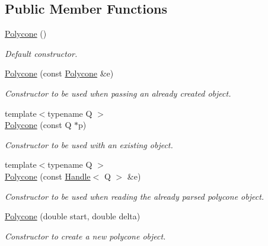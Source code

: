 \subsection*{Public Member Functions}
\begin{DoxyCompactItemize}
\item 
\hyperlink{class_d_d4hep_1_1_geometry_1_1_polycone_a0946449c311d2cfdb9381e9dd975f6e9}{Polycone} ()
\begin{DoxyCompactList}\small\item\em Default constructor. \item\end{DoxyCompactList}\item 
\hyperlink{class_d_d4hep_1_1_geometry_1_1_polycone_adf0ec9439b0bd1a4a2d12e51d0885ba0}{Polycone} (const \hyperlink{class_d_d4hep_1_1_geometry_1_1_polycone}{Polycone} \&e)
\begin{DoxyCompactList}\small\item\em Constructor to be used when passing an already created object. \item\end{DoxyCompactList}\item 
{\footnotesize template$<$typename Q $>$ }\\\hyperlink{class_d_d4hep_1_1_geometry_1_1_polycone_add60214e19fc5def3c76007c602517d7}{Polycone} (const Q $\ast$p)
\begin{DoxyCompactList}\small\item\em Constructor to be used with an existing object. \item\end{DoxyCompactList}\item 
{\footnotesize template$<$typename Q $>$ }\\\hyperlink{class_d_d4hep_1_1_geometry_1_1_polycone_abbf81a5ca5e5b3a41d565d3ac2ce3950}{Polycone} (const \hyperlink{class_d_d4hep_1_1_handle}{Handle}$<$ Q $>$ \&e)
\begin{DoxyCompactList}\small\item\em Constructor to be used when reading the already parsed polycone object. \item\end{DoxyCompactList}\item 
\hyperlink{class_d_d4hep_1_1_geometry_1_1_polycone_aee9015113e47313a9b382ed7ce0ec63b}{Polycone} (double start, double delta)
\begin{DoxyCompactList}\small\item\em Constructor to create a new polycone object. \item\end{DoxyCompactList}\item 

\end{DoxyCompactItemize}
